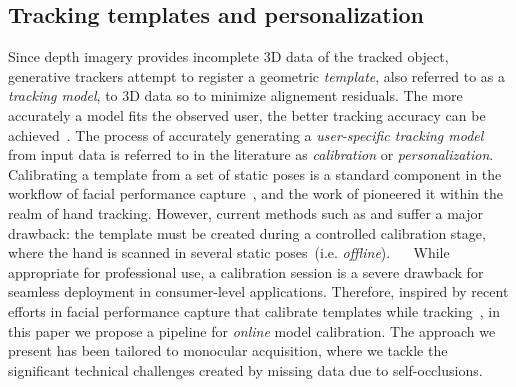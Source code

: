 \subsection*{Tracking templates and personalization}
Since depth imagery provides incomplete 3D data of the tracked object, generative trackers attempt to register a geometric \emph{template}, also referred to as a \emph{tracking model}, to 3D data so to minimize alignement residuals.
The more accurately a model fits the observed user, the better tracking accuracy can be achieved~\cite{tkach2016sphere,taylor2016joint}. The process of accurately generating a \emph{user-specific tracking model} from input data is referred to in the literature as \emph{calibration} or \emph{personalization}. 
Calibrating a template from a set of static poses is a standard component in the workflow of facial performance capture~\cite{weise2011realtime,cao2015facial}, and the work of  \cite{taylor2014user} pioneered it within the realm of hand tracking. However, current methods such as \cite{taylor2016joint} and \cite{tkach2016sphere} suffer a major drawback: the template must be created during a controlled calibration stage, where the hand is scanned in several static poses~(i.e. \emph{offline}). 
% 
$\quad$
% 
While appropriate for professional use, a calibration session is a severe drawback for seamless deployment in consumer-level applications.
Therefore, inspired by recent efforts in facial performance capture that calibrate templates while tracking~\cite{li_sig13,bouaziz2013online}, in this paper we propose a pipeline for \emph{online} model calibration. 
The approach we present has been tailored to monocular acquisition, where we tackle the significant technical challenges created by missing data due to self-occlusions.

